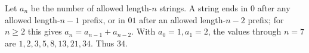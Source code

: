 Let $a_n$ be the number of allowed length-$n$ strings. A string ends in $0$ after any allowed length-$n-1$ prefix, or in $01$ after an allowed length-$n-2$ prefix; for $n\ge2$ this gives $a_n=a_{n-1}+a_{n-2}$. With $a_0=1,a_1=2$, the values through $n=7$ are $1,2,3,5,8,13,21,34$. Thus $\boxed{34}$.
